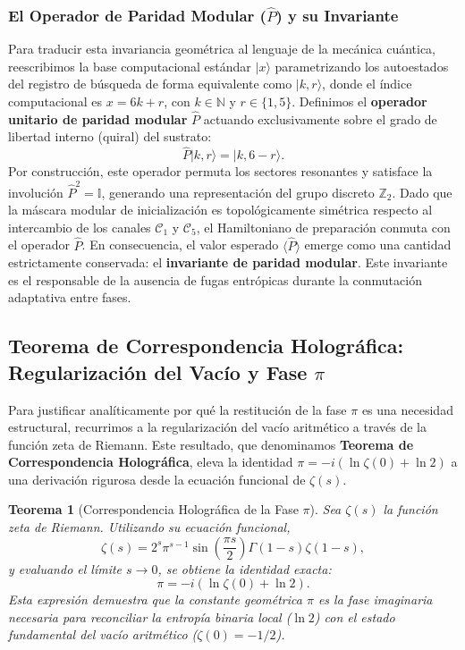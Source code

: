 \documentclass[12pt,a4paper]{article}
\theoremstyle{plain}
\newtheorem{teorema}{Teorema}[section]
\theoremstyle{definition}
\theoremstyle{remark}
\begin{document}
\subsubsection*{El Operador de Paridad Modular ($\hat{P}$) y su Invariante}

Para traducir esta invariancia geométrica al lenguaje de la mecánica cuántica, reescribimos la base computacional estándar $|x\rangle$ parametrizando los autoestados del registro de búsqueda de forma equivalente como $|k, r\rangle$, donde el índice computacional es $x = 6k + r$, con $k \in \mathbb{N}$ y $r \in \{1, 5\}$. Definimos el \textbf{operador unitario de paridad modular} $\hat{P}$ actuando exclusivamente sobre el grado de libertad interno (quiral) del sustrato:
\begin{equation}
\hat{P} |k, r\rangle = |k, 6-r\rangle.
\end{equation}
Por construcción, este operador permuta los sectores resonantes y satisface la involución $\hat{P}^2 = \mathbb{I}$, generando una representación del grupo discreto $\mathbb{Z}_2$. Dado que la máscara modular de inicialización es topológicamente simétrica respecto al intercambio de los canales $\mathcal{C}_1$ y $\mathcal{C}_5$, el Hamiltoniano de preparación conmuta con el operador $\hat{P}$. En consecuencia, el valor esperado $\langle \hat{P} \rangle$ emerge como una cantidad estrictamente conservada: el \textbf{invariante de paridad modular}. Este invariante es el responsable de la ausencia de fugas entrópicas durante la conmutación adaptativa entre fases.

\subsection{Teorema de Correspondencia Holográfica: Regularización del Vacío y Fase $\pi$}
\label{subsec:teorema_holografico}

Para justificar analíticamente por qué la restitución de la fase $\pi$ es una necesidad estructural, recurrimos a la regularización del vacío aritmético a través de la función zeta de Riemann. Este resultado, que denominamos \textbf{Teorema de Correspondencia Holográfica}, eleva la identidad $\pi = -i(\ln \zeta(0) + \ln 2)$ a una derivación rigurosa desde la ecuación funcional de $\zeta(s)$.

\begin{teorema}[Correspondencia Holográfica de la Fase $\pi$]
Sea $\zeta(s)$ la función zeta de Riemann. Utilizando su ecuación funcional,
\begin{equation}
\zeta(s) = 2^s \pi^{s-1} \sin\left(\frac{\pi s}{2}\right) \Gamma(1-s) \zeta(1-s),
\end{equation}
y evaluando el límite $s \to 0$, se obtiene la identidad exacta:
\begin{equation}
\pi = -i\left(\ln \zeta(0) + \ln 2\right).
\end{equation}
Esta expresión demuestra que la constante geométrica $\pi$ es la fase imaginaria necesaria para reconciliar la entropía binaria local ($\ln 2$) con el estado fundamental del vacío aritmético ($\zeta(0) = -1/2$).
\end{teorema}
\end{document}
